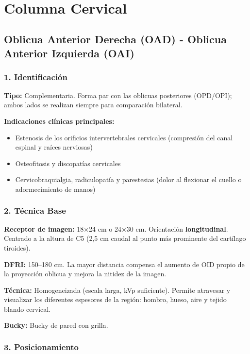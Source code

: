 		\section{Columna Cervical}
		
		\subsection{Oblicua Anterior Derecha (OAD) - Oblicua Anterior Izquierda (OAI)}
		
		\subsubsection*{1. Identificación}
		
		\textbf{Tipo:} Complementaria. Forma par con las oblicuas posteriores (OPD/OPI); ambos lados se realizan siempre para comparación bilateral.
		
		\textbf{Indicaciones clínicas principales:}
		\begin{itemize}
			\item Estenosis de los orificios intervertebrales cervicales (compresión del canal espinal y raíces nerviosas)
			\item Osteofitosis y discopatías cervicales
			\item Cervicobraquialgia, radiculopatía y parestesias (dolor al flexionar el cuello o adormecimiento de manos)
		\end{itemize}
		
		\subsubsection*{2. Técnica Base}
		
		\textbf{Receptor de imagen:} 18$\times$24 cm o 24$\times$30 cm. Orientación \textbf{longitudinal}. Centrado a la altura de C5 (2,5 cm caudal al punto más prominente del cartílago tiroides).
		
		\textbf{DFRI:} 150--180 cm. La mayor distancia compensa el aumento de OID propio de la proyección oblicua y mejora la nitidez de la imagen.
		
		\textbf{Técnica:} Homogeneizada (escala larga, kVp suficiente). Permite atravesar y visualizar los diferentes espesores de la región: hombro, hueso, aire y tejido blando cervical.
		
		\textbf{Bucky:} Bucky de pared con grilla.
		
		\subsubsection*{3. Posicionamiento}
		

